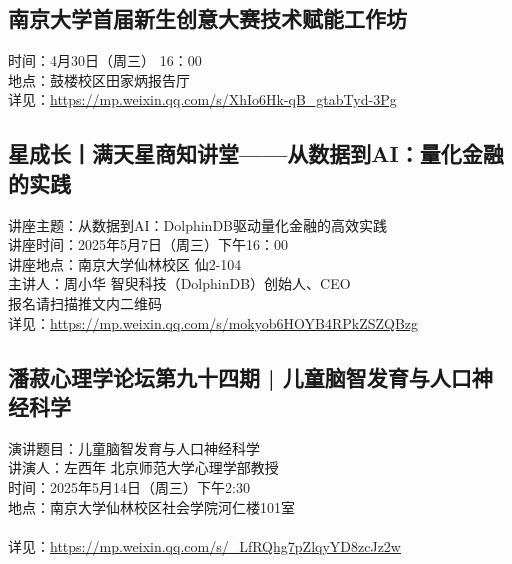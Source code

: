 \documentclass[letterpaper, 12pt]{article}
\begin{document}
\begin{multicols}{2}
\subsection{南京大学首届新生创意大赛技术赋能工作坊} %
时间：4月30日（周三） 16：00
\\地点：鼓楼校区田家炳报告厅
\\详见：\url{https://mp.weixin.qq.com/s/XhIo6Hk-qB_gtabTyd-3Pg}

\subsection{星成长丨满天星商知讲堂——从数据到AI：量化金融的实践} %
讲座主题：从数据到AI：DolphinDB驱动量化金融的高效实践
\\讲座时间：2025年5月7日（周三）下午16：00
\\讲座地点：南京大学仙林校区 仙2-104
\\主讲人：周小华 智臾科技（DolphinDB）创始人、CEO
\\报名请扫描推文内二维码
\\详见：\url{https://mp.weixin.qq.com/s/mokyob6HOYB4RPkZSZQBzg}

\subsection{潘菽心理学论坛第九十四期 | 儿童脑智发育与人口神经科学} %
演讲题目：儿童脑智发育与人口神经科学
\\讲演人：左西年 北京师范大学心理学部教授
\\时间：2025年5月14日（周三）下午2:30
\\地点：南京大学仙林校区社会学院河仁楼101室
\\
\\详见：\url{https://mp.weixin.qq.com/s/_LfRQhg7pZlqyYD8zcJz2w}



\end{multicols}
\end{document}
